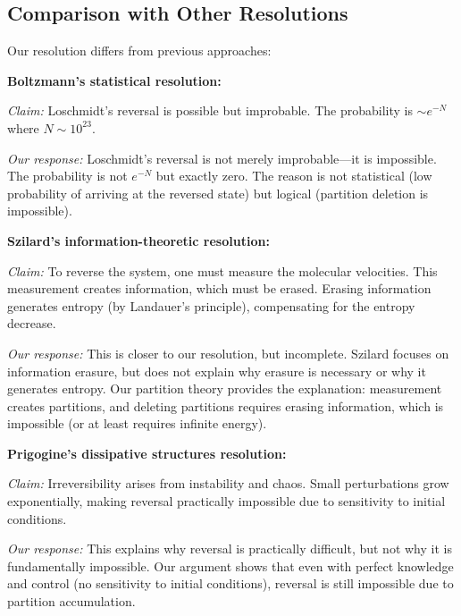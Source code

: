 \documentclass[twocolumn,10pt]{article}
\theoremstyle{definition}
\theoremstyle{remark}
\begin{document}
\subsection{Comparison with Other Resolutions}

Our resolution differs from previous approaches:

\vspace{0.2cm}
\noindent\textbf{Boltzmann's statistical resolution\cite{boltzmann1877}:}

\textit{Claim:} Loschmidt's reversal is possible but improbable. The probability is $\sim e^{-N}$ where $N \sim 10^{23}$.

\textit{Our response:} Loschmidt's reversal is not merely improbable—it is impossible. The probability is not $e^{-N}$ but exactly zero. The reason is not statistical (low probability of arriving at the reversed state) but logical (partition deletion is impossible).

\vspace{0.2cm}
\noindent\textbf{Szilard's information-theoretic resolution\cite{szilard1929}:}

\textit{Claim:} To reverse the system, one must measure the molecular velocities. This measurement creates information, which must be erased. Erasing information generates entropy (by Landauer's principle\cite{landauer1961}), compensating for the entropy decrease.

\textit{Our response:} This is closer to our resolution, but incomplete. Szilard focuses on information erasure, but does not explain why erasure is necessary or why it generates entropy. Our partition theory provides the explanation: measurement creates partitions, and deleting partitions requires erasing information, which is impossible (or at least requires infinite energy).

\vspace{0.2cm}
\noindent\textbf{Prigogine's dissipative structures resolution\cite{prigogine1977}:}

\textit{Claim:} Irreversibility arises from instability and chaos. Small perturbations grow exponentially, making reversal practically impossible due to sensitivity to initial conditions.

\textit{Our response:} This explains why reversal is practically difficult, but not why it is fundamentally impossible. Our argument shows that even with perfect knowledge and control (no sensitivity to initial conditions), reversal is still impossible due to partition accumulation.
\end{document}
